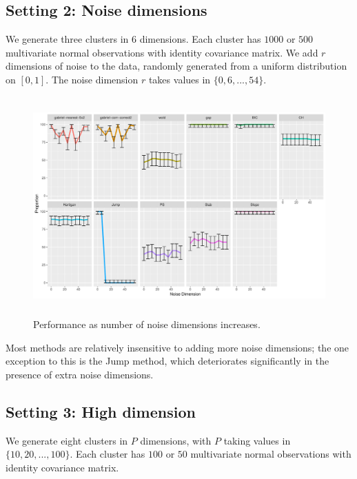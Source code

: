 \documentclass[12pt]{article}
\begin{document}
\subsection{Setting 2: Noise dimensions}

We generate three clusters in $6$ dimensions. Each cluster has $1000$ or $500$
multivariate normal observations with identity covariance matrix.
We add $r$ dimensions of noise to the data, randomly generated from a uniform
distribution on $[0,1]$. The noise dimension $r$ takes values in
$\{0,6,...,54\}$. 
	
\begin{figure}[H]
\centering
\includegraphics[width=5.5in, height=3.3in]{main_code/demo/bench/setting2/Facet.pdf}
\caption{Performance as number of noise dimensions increases.}
\label{fig:setting2}
\end{figure}

Most methods are relatively insensitive to adding more noise dimensions; the
one exception to this is the Jump method, which deteriorates significantly in
the presence of extra noise dimensions.


\subsection{Setting 3: High dimension}

We generate eight clusters in $P$ dimensions, with $P$ taking values in
$\{10,20,...,100\}$.  Each cluster has $100$ or $50$ multivariate
normal observations with identity covariance matrix. 
	
\end{document}
